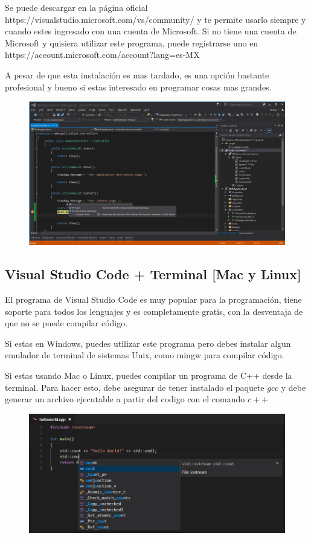 \documentclass{article}
\begin{document}
Se puede descargar en la página oficial https://visualstudio.microsoft.com/vs/community/ y te permite usarlo siempre y cuando estes ingresado con una cuenta de Microsoft. Si no tiene una cuenta de Microsoft y quisiera utilizar este programa, puede registrarse uno en https://account.microsoft.com/account?lang=es-MX

A pesar de que esta instalación es mas tardado, es una opción bastante profesional y bueno si estas interesado en programar cosas mas grandes.

\begin{figure}[H]
    \centering
    \includegraphics[width=0.5\paperwidth]{vscommunity}
\end{figure}

\subsection{Visual Studio Code + Terminal [Mac y Linux]}
El programa de Visual Studio Code es muy popular para la programación, tiene soporte para todos los lenguajes y es completamente gratis, con la desventaja de que no se puede compilar código.

Si estas en Windows, puedes utilizar este programa pero debes instalar algun emulador de terminal de sistemas Unix, como mingw para compilar código.

Si estas usando Mac o Linux, puedes compilar un programa de C++ desde la terminal. Para hacer esto, debe asegurar de tener instalado el paquete $gcc$ y debe generar un archivo ejecutable a partir del codigo con el comando $c++$

\begin{figure}[H]
    \centering
    \includegraphics[width=0.5\paperwidth]{vscode}
\end{figure}
\end{document}
